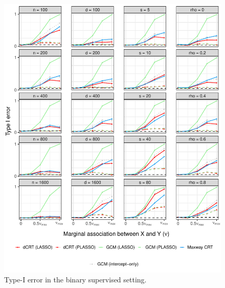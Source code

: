 \documentclass[aos]{imsart}
\theoremstyle{plain}
\theoremstyle{remark}
\begin{document}
\begin{figure}[!ht]
	\centering
	\includegraphics[width = \textwidth]{figures/binomial_supervised_setting_null.pdf}
	\caption{Type-I error in the binary supervised setting.}
	\label{fig:binomial_supervised_null}
\end{figure}
\end{document}
